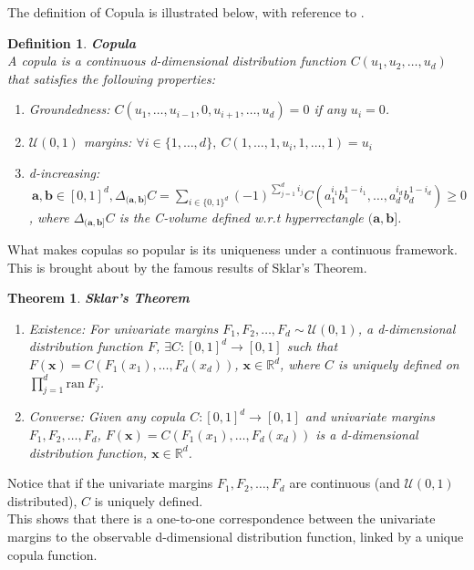 \documentclass[12pt]{report}
\newtheorem{theorem}{Theorem}[subsection]
\newtheorem{definition}{Definition}[subsection]
\newcommand{\1}{\mathbf{1}}
\begin{document}
\vspace{0.5cm}
The definition of Copula is illustrated below, with reference to \cite{HofertBook}.\\

\begin{definition}\label{CopProperties}
\textbf{Copula} \\
A copula is a continuous d-dimensional distribution function $C(u_{1}, u_{2}, \dots, u_{d}) $ that satisfies the following properties: \\
\begin{enumerate}
    \item Groundedness: \: $C(u_{1}, \dots, u_{i-1}, 0, u_{i+1}, \dots, u_{d}) = 0$ if any $u_{i} = 0$.\\
    \item $\mathcal{U}(0,1)$ margins: \: $\forall i \in \{1, \dots,d\}, \: C(1, \dots, 1, u_{i}, 1, \dots, 1) = u_{i}$\\
    \item d-increasing: $\: \boldsymbol{a}, \boldsymbol{b} \in [0,1]^{d}, \Delta_{(\boldsymbol{a},\boldsymbol{b}]}C = \sum\limits_{i \in \{0,1\}^{d}} (-1)^{\sum_{j=1}^{d}i_{j}}C(a_{1}^{i_{1}}b_{1}^{1-i_{1}}, \dots, a_{d}^{i_{d}}b_{d}^{1-i_{d}})  \ge 0 $, \: where $\Delta_{(\boldsymbol{a},\boldsymbol{b}]}C$ is the C-volume defined w.r.t hyperrectangle $(\boldsymbol{a},\boldsymbol{b}]$.
\end{enumerate}
\end{definition}


What makes copulas so popular is its uniqueness under a continuous framework. This is brought about by the famous results of Sklar's Theorem.

\begin{theorem}\label{SklarTheorem}
\textit{\normalfont \parencite{SklarTheorem}}
\textbf{Sklar's Theorem}
\vspace{-0.2cm}
\begin{enumerate}
    \item Existence: For univariate margins $F_{1}, F_{2}, \dots, F_{d} \sim \mathcal{U}(0,1)$, a d-dimensional distribution function $F$, $\exists C: [0,1]^{d} \rightarrow [0,1]$ such that $F(\boldsymbol{x}) = C(F_{1}(x_{1}), \dots, F_{d}(x_{d}))$, $\boldsymbol{x} \in \mathbb{R}^{d}$, where $C$ is uniquely defined on $\prod_{j=1}^{d} \mathrm{ran} \: F_{j}$.
    \item Converse: Given any copula $C: [0,1]^{d} \rightarrow [0,1]$ and univariate margins $F_{1}, F_{2}, \dots, F_{d}$, $F(\boldsymbol{x}) = C(F_{1}(x_{1}), \dots, F_{d}(x_{d}))$ is a d-dimensional distribution function, $\boldsymbol{x} \in \mathbb{R}^{d}$.
\end{enumerate}
\end{theorem}
Notice that if the univariate margins $F_{1}, F_{2}, \dots, F_{d}$ are continuous (and $\mathcal{U}(0,1)$ distributed), $C$ is uniquely defined. \\
\vspace{0.5cm}
This shows that there is a one-to-one correspondence between the univariate margins to the observable d-dimensional distribution function, linked by a unique copula function. \\
\vspace{0.5cm}
\end{document}
